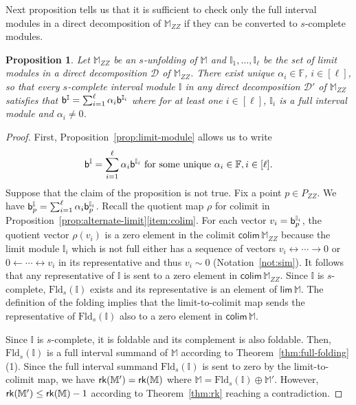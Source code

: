 \documentclass[11pt]{article}
\theoremstyle{plain}%
\newtheorem{proposition}{Proposition}[section]
\newcommand{\Int}{\mathbb{I}}
\newcommand{\M}{\mathbb{M}}
\newcommand{\D}{\mathcal{D}}
\newcommand{\Fld}{\mathrm{Fld}}
\newcommand{\bs}{{\sf b}}
\newcommand{\rk}{{\sf{rk}}}
\newcommand{\limproj}{\mathsf{lim}}
\newcommand{\colim}{\mathsf{colim}}
\newcommand{\cheng}[1]		{{ \textcolor{darkred} { #1}}}
\begin{document}
Next proposition tells us that it is sufficient to check only the full
interval modules in a direct decomposition of $\M_{ZZ}$ if they can be converted to $s$-complete modules.

\begin{proposition}
Let $\M_{ZZ}$ be an $s$-unfolding of $\M$ and $\Int_1,\ldots,\Int_\ell$ be the set of limit modules in a direct decomposition $\D$ of $\M_{ZZ}$. 
There exist unique $\alpha_i\in\mathbb{F}$, $i\in [\ell]$, so that every
$s$-complete interval module $\Int$ in any direct decomposition $\D'$ of $\M_{ZZ}$ satisfies that
$\bs^\Int=\sum_{i=1}^\ell\alpha_i\bs^{\Int_i}$ where for at least one $i\in [\ell]$, $\Int_i$ is a full interval module and $\alpha_i\not=0$.
\label{prop:complete-interval}
\end{proposition}
\begin{proof}
First, Proposition~\ref{prop:limit-module} allows us to write $$\bs^\Int=\sum_{i=1}^\ell\alpha_i\bs^{\Int_i} \mbox{ for
some unique }\alpha_i\in\mathbb{F}, i\in [\ell].
$$
Suppose that the claim of the proposition is not true. 
Fix a point $p\in P_{ZZ}$.
We have $\bs^{\Int}_p=\sum_{i=1}^\ell\alpha_i \bs^{\Int_i}_p$. 
Recall the quotient map $\rho$ for
colimit in Proposition~\ref{prop:alternate-limit}\ref{item:colim}.
For each vector
$v_i=\bs^{\Int_i}_p$, the quotient vector $\rho(v_i)$ is a zero element in the colimit $\colim\, \M_{ZZ}$ because the limit module $\Int_i$ which is not
full either has a sequence of vectors $v_i\leftrightarrow \cdots\rightarrow 0$ or $0\leftarrow \cdots \leftrightarrow v_i$ in its representative and thus
$v_i\sim 0$ (Notation~\ref{not:sim}). It follows that any representative of
$\Int$ is sent to a zero element
in $\colim\, \M_{ZZ}$. Since $\Int$ is $s$-complete, $\Fld_s(\Int)$ exists and its
representative is an element of $\limproj\, \M$. The definition
of the folding implies that the limit-to-colimit
map sends the representative of $\Fld_s(\Int)$ also to a zero element in $\colim\, \M$.


Since $\Int$ is $s$-complete, it is foldable and its complement is also foldable. Then, $\Fld_s(\Int)$ is a full interval summand of $\M$ according to
Theorem~\ref{thm:full-folding}(1). Since the full interval summand $\Fld_s(\Int)$ is sent to zero by the limit-to-colimit map, we have 
$\rk(\M')=\rk(\M)$ where $\M=\Fld_s(\Int)\oplus \M'$. However, $\rk(\M')\leq \rk(\M)-1$
according to Theorem~\ref{thm:rk} reaching a contradiction.
\end{proof}
\end{document}
